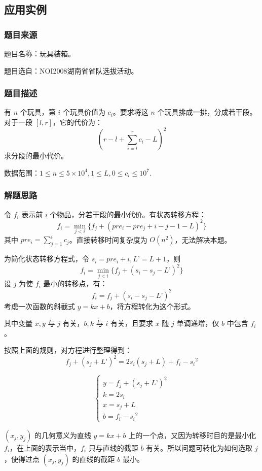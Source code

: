 \documentclass[a4paper, UTF8]{ctexart}
\begin{document}
\subsection{应用实例}

\subsubsection{题目来源}

题目名称：玩具装箱。

题目选自：NOI2008湖南省省队选拔活动。

\subsubsection{题目描述}

有 \(n\) 个玩具，第 \(i\) 个玩具价值为 \(c_i\)。要求将这 \(n\)
个玩具排成一排，分成若干段。对于一段 \([l,r]\)，它的代价为： \[
(r-l+\sum_{i=l}^r c_i-L)^2
\] 求分段的最小代价。

数据范围：\(1\le n\le 5\times 10^4,1\le L,0\le c_i\le 10^7\).

\subsubsection{解题思路}

令 \(f_i\) 表示前 \(i\) 个物品，分若干段的最小代价。有状态转移方程： \[
f_i=\min_{j<i}{\{f_j+(pre_i-pre_j+i-j-1-L)^2\}}
\] 其中 \(pre_i = \sum_{j=1}^i c_j\)。直接转移时间复杂度为
\(O (n^2)\)，无法解决本题。

为简化状态转移方程式，令 \(s_i=pre_i+i,L’=L+1\)，则 \[
f_i=\min_{j<i}\{f_j+(s_i-s_j-L’)^2\}
\] 设 \(j\) 为使 \(f_i\) 最小的转移点，有： \[
f_i=f_j+(s_i-s_j-L’)^2
\] 考虑一次函数的斜截式 \(y=kx+b\)，将方程转化为这个形式。

其中变量 \(x, y\) 与 \(j\) 有关，\(b, k\) 与 \(i\) 有关，且要求 \(x\) 随
\(j\) 单调递增，仅 \(b\) 中包含 \(f_i\)。

按照上面的规则，对方程进行整理得到： \[
f_j+(s_j+L’)^2=2s_i(s_j+L)+f_i-{s_i}^2
\]

\[
\left\{
\begin{array}{lr}
y = f_j+(s_j+L’)^2\\
k = 2s_i\\
x = s_j+L\\
b = f_i-{s_i}^2
\end{array}
\right.
\]

\((x_j, y_j)\) 的几何意义为直线 \(y=kx+b\)
上的一个点，又因为转移时目的是最小化 \(f_i\)，在上面的表示当中，\(f_i\)
只与直线的截距 \(b\) 有关。所以问题可转化为如何选取 \(j\) ，使得过点
\((x_j, y_j)\) 的直线的截距 \(b\) 最小。
\end{document}
